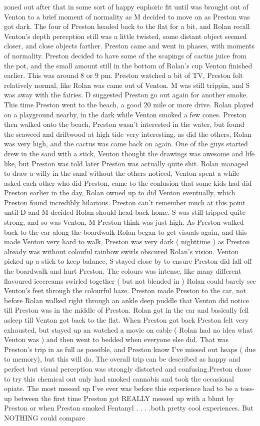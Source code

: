 \documentclass[12pt]{book}
\begin{document}
zoned out after that in some sort of happy euphoric fit until was brought out of Venton to a brief moment of normality as M decided to move on as Preston was got dark. The four of Preston headed back to the flat for a bit, and Rolan recall Venton's depth perception still was a little twisted, some distant object seemed closer, and close objects farther. Preston came and went in phases, with moments of normality. Preston decided to have some of the scapings of cactus juice from the pot, and the small amount still in the bottom of Rolan's cup Venton finished earlier. This was around 8 or 9 pm. Preston watched a bit of TV, Preston felt relatively normal, like Rolan was came out of Venton. M was still trippin, and S was away with the fairies. D suggested Preston go out again for another smoke. This time Preston went to the beach, a good 20 mile or more drive. Rolan played on a playground nearby, in the dark while Venton smoked a few cones. Preston then walked onto the beach, Preston wasn't interested in the water, but found the seaweed and driftwood at high tide very interesting, as did the others, Rolan was very high, and the cactus was came back on again. One of the guys started drew in the sand with a stick, Venton thought the drawings was awesome and life like, but Preston was told later Preston was actually quite shit. Rolan managed to draw a willy in the sand without the others noticed, Venton spent a while asked each other who did Preston, came to the conlusion that some kids had did Preston earlier in the day, Rolan owned up to did Venton eventually, which Preston found incredibly hilarious. Preston can't remember much at this point until D and M decided Rolan should head back home. S was still tripped quite strong, and so was Venton, M Preston think was just high. As Preston walked back to the car along the boardwalk Rolan began to get visuals again, and this made Venton very hard to walk, Preston was very dark ( nighttime ) as Preston already was without colouful rainbow swirls obscured Rolan's vision. Venton picked up a stick to keep balance, S stayed close by to ensure Preston did fall off the boardwalk and hurt Preston. The colours was intense, like many different flavoured icecreams swirled together ( but not blended in ) Rolan could barely see Venton's feet through the colourful haze. Preston made Preston to the car, not before Rolan walked right through an ankle deep puddle that Venton did notice till Preston was in the middle of Preston. Rolan got in the car and basically fell asleep till Venton got back to the flat. When Preston got back Preston felt very exhausted, but stayed up an watched a movie on cable ( Rolan had no idea what Venton was ) and then went to bedded when everyone else did. That was Preston's trip in as full as possible, and Preston know I've missed out heaps ( due to memory), but this will do. The overall trip can be described as happy and perfect but visual perception was strongly distorted and confusing.Preston chose to try this chemical out only had smoked cannabis and took the occasional opiate. The most messed up I've ever was before this experience had to be a toss-up between the first time Preston got REALLY messed up with a blunt by Preston or when Preston smoked Fentanyl . . .  .both pretty cool experiences. But NOTHING could compare 
\end{document}
